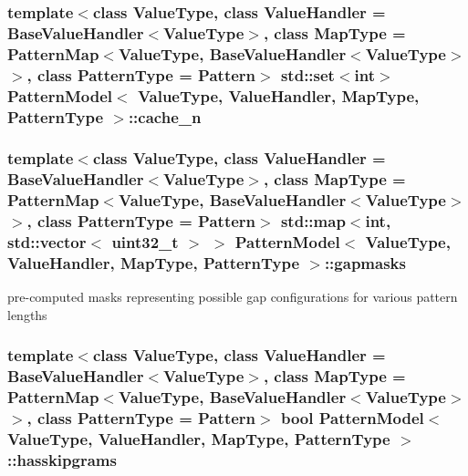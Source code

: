 \subsubsection[{cache\+\_\+n}]{\setlength{\rightskip}{0pt plus 5cm}template$<$class Value\+Type, class Value\+Handler = Base\+Value\+Handler$<$\+Value\+Type$>$, class Map\+Type = Pattern\+Map$<$\+Value\+Type, Base\+Value\+Handler$<$\+Value\+Type$>$$>$, class Pattern\+Type = Pattern$>$ std\+::set$<$int$>$ {\bf Pattern\+Model}$<$ Value\+Type, Value\+Handler, Map\+Type, {\bf Pattern\+Type} $>$\+::cache\+\_\+n\hspace{0.3cm}{\ttfamily [protected]}}\label{classPatternModel_a2ac397c0ba615b4ac11d7014bea8efcb}
\hypertarget{classPatternModel_a6136c80df09f3721420f97606c6412b6}{}
\subsubsection[{gapmasks}]{\setlength{\rightskip}{0pt plus 5cm}template$<$class Value\+Type, class Value\+Handler = Base\+Value\+Handler$<$\+Value\+Type$>$, class Map\+Type = Pattern\+Map$<$\+Value\+Type, Base\+Value\+Handler$<$\+Value\+Type$>$$>$, class Pattern\+Type = Pattern$>$ std\+::map$<$int, std\+::vector$<$ uint32\+\_\+t $>$ $>$ {\bf Pattern\+Model}$<$ Value\+Type, Value\+Handler, Map\+Type, {\bf Pattern\+Type} $>$\+::gapmasks\hspace{0.3cm}{\ttfamily [protected]}}\label{classPatternModel_a6136c80df09f3721420f97606c6412b6}


pre-\/computed masks representing possible gap configurations for various pattern lengths 

\hypertarget{classPatternModel_a56ba07cb9c7691cb228903681d707436}{}
\subsubsection[{hasskipgrams}]{\setlength{\rightskip}{0pt plus 5cm}template$<$class Value\+Type, class Value\+Handler = Base\+Value\+Handler$<$\+Value\+Type$>$, class Map\+Type = Pattern\+Map$<$\+Value\+Type, Base\+Value\+Handler$<$\+Value\+Type$>$$>$, class Pattern\+Type = Pattern$>$ bool {\bf Pattern\+Model}$<$ Value\+Type, Value\+Handler, Map\+Type, {\bf Pattern\+Type} $>$\+::hasskipgrams}\label{classPatternModel_a56ba07cb9c7691cb228903681d707436}


